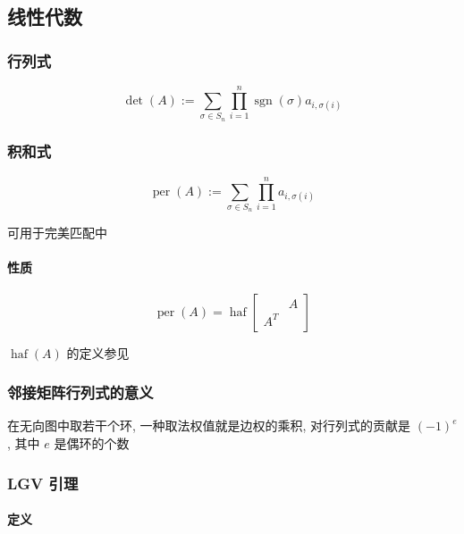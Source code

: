 \subsection{线性代数}

\subsubsection{行列式}

\begin{equation}
    \operatorname{det}(A):=\sum_{\sigma\in S_n}\prod_{i=1}^n \operatorname{sgn}(\sigma) a_{i,\sigma(i)}
\end{equation}

\subsubsection{积和式}

\begin{equation}
    \operatorname{per}(A):=\sum_{\sigma\in S_n}\prod_{i=1}^n a_{i,\sigma(i)}
\end{equation}

可用于完美匹配中

\paragraph{性质}

\begin{equation}
    \operatorname{per}(A)=\operatorname{haf}\begin{bmatrix}
            & A \\
        A^T & 
    \end{bmatrix}
\end{equation}

\(\operatorname{haf}(A)\) 的定义参见 

\subsubsection{邻接矩阵行列式的意义}

在无向图中取若干个环, 一种取法权值就是边权的乘积, 对行列式的贡献是 \((-1)^{e}\), 其中 \(e\) 是偶环的个数

\subsubsection{LGV 引理}

\paragraph{定义}

